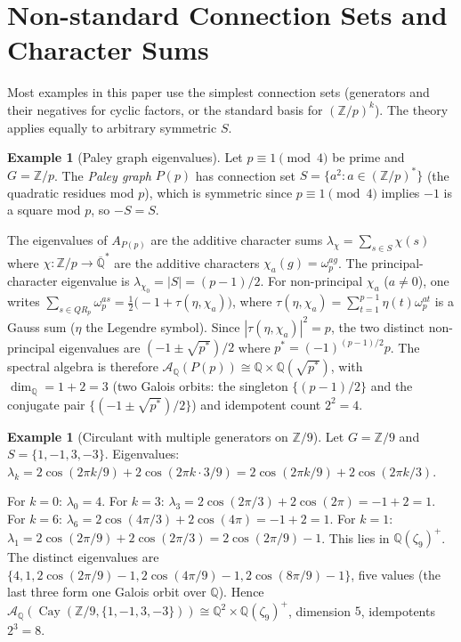 \documentclass[12pt]{amsart}
\numberwithin{equation}{section}
\theoremstyle{plain}
\theoremstyle{definition}
\newtheorem{example}[theorem]{Example}
\DeclareMathOperator{\Cay}{Cay}
\newcommand{\Z}{\mathbb{Z}}
\newcommand{\Q}{\mathbb{Q}}
\newcommand{\calA}{\mathcal{A}}
\begin{document}
\section{Non-standard Connection Sets and Character Sums}
\label{sec:nonstandard}

Most examples in this paper use the simplest connection sets
(generators and their negatives for cyclic factors, or the standard
basis for $(\Z/p)^k$).  The theory applies equally to arbitrary
symmetric $S$.

\begin{example}[Paley graph eigenvalues]
Let $p \equiv 1 \pmod{4}$ be prime and $G = \Z/p$.  The \emph{Paley
graph} $P(p)$ has connection set $S = \{a^2 : a \in (\Z/p)^*\}$ (the
quadratic residues mod $p$), which is symmetric since $p \equiv 1
\pmod{4}$ implies $-1$ is a square mod $p$, so $-S = S$.

The eigenvalues of $A_{P(p)}$ are the additive character sums
$\lambda_\chi = \sum_{s \in S} \chi(s)$ where $\chi : \Z/p \to
\overline{\Q}^*$ are the additive characters $\chi_a(g) = \omega_p^{ag}$.
The principal-character eigenvalue is $\lambda_{\chi_0} = |S| = (p-1)/2$.
For non-principal $\chi_a$ ($a \ne 0$), one writes
$\sum_{s \in QR_p} \omega_p^{as} = \frac{1}{2}\bigl(-1 + \tau(\eta,
\chi_a)\bigr)$, where $\tau(\eta, \chi_a) = \sum_{t=1}^{p-1} \eta(t)
\omega_p^{at}$ is a Gauss sum ($\eta$ the Legendre symbol).  Since
$|\tau(\eta, \chi_a)|^2 = p$, the two distinct non-principal eigenvalues
are $(-1 \pm \sqrt{p^*})/2$ where $p^* = (-1)^{(p-1)/2} p$.
The spectral algebra is therefore
$\calA_\Q(P(p)) \cong \Q \times \Q(\sqrt{p^*})$, with
$\dim_\Q = 1 + 2 = 3$ (two Galois orbits: the singleton $\{(p-1)/2\}$
and the conjugate pair $\{(-1\pm\sqrt{p^*})/2\}$) and
idempotent count $2^2 = 4$.
\end{example}

\begin{example}[Circulant with multiple generators on $\Z/9$]
Let $G = \Z/9$ and $S = \{1,-1,3,-3\}$.  Eigenvalues:
$\lambda_k = 2\cos(2\pi k/9) + 2\cos(2\pi k \cdot 3/9)
= 2\cos(2\pi k/9) + 2\cos(2\pi k/3)$.

For $k = 0$: $\lambda_0 = 4$.  For $k = 3$: $\lambda_3 = 2\cos(2\pi/3)
+ 2\cos(2\pi) = -1 + 2 = 1$.  For $k = 6$: $\lambda_6 = 2\cos(4\pi/3)
+ 2\cos(4\pi) = -1 + 2 = 1$.  For $k = 1$: $\lambda_1 = 2\cos(2\pi/9)
+ 2\cos(2\pi/3) = 2\cos(2\pi/9) - 1$.  This lies in $\Q(\zeta_9)^+$.
The distinct eigenvalues are $\{4, 1, 2\cos(2\pi/9)-1,
2\cos(4\pi/9)-1, 2\cos(8\pi/9)-1\}$, five values (the last three form
one Galois orbit over $\Q$).  Hence
$\calA_\Q(\Cay(\Z/9, \{1,-1,3,-3\})) \cong \Q^2 \times \Q(\zeta_9)^+$,
dimension $5$, idempotents $2^3 = 8$.
\end{example}
\end{document}
